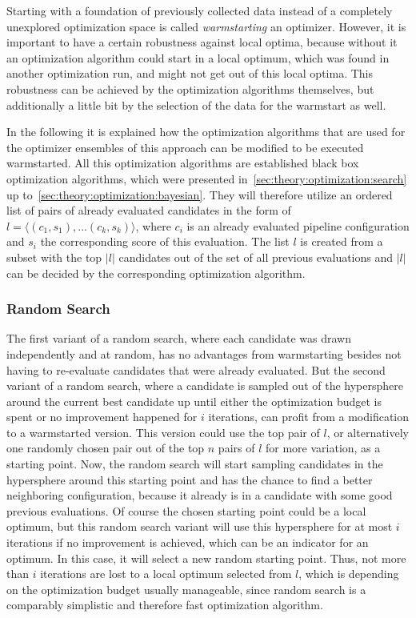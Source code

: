 Starting with a foundation of previously collected data instead of a completely unexplored optimization space is called \textit{warmstarting} an optimizer.
However, it is important to have a certain robustness against local optima, because without it an optimization algorithm could start in a local optimum, which was found in another optimization run, and might not get out of this local optima.
This robustness can be achieved by the optimization algorithms themselves, but additionally a little bit by the selection of the data for the warmstart as well.

In the following it is explained how the optimization algorithms that are used for the optimizer ensembles of this approach can be modified to be executed warmstarted.
All this optimization algorithms are established black box optimization algorithms, which were presented in~\ref{sec:theory:optimization:search} up to~\ref{sec:theory:optimization:bayesian}.
They will therefore utilize an ordered list of pairs of already evaluated candidates in the form of $l = \langle (c_1, s_1), ... (c_k, s_k) \rangle$, where $c_i$ is an already evaluated pipeline configuration and $s_i$ the corresponding score of this evaluation.
The list $l$ is created from a subset with the top $|l|$ candidates out of the set of all previous evaluations and $|l|$ can be decided by the corresponding optimization algorithm.

\subsubsection{Random Search}
The first variant of a random search, where each candidate was drawn independently and at random, has no advantages from warmstarting besides not having to re-evaluate candidates that were already evaluated.\newline
But the second variant of a random search, where a candidate is sampled out of the hypersphere around the current best candidate up until either the optimization budget is spent or no improvement happened for $i$ iterations, can profit from a modification to a warmstarted version.
This version could use the top pair of $l$, or alternatively one randomly chosen pair  out of the top $n$ pairs of $l$ for more variation, as a starting point.\newline
Now, the random search will start sampling candidates in the hypersphere around this starting point and has the chance to find a better neighboring configuration, because it already is in a candidate with some good previous evaluations.\newline
Of course the chosen starting point could be a local optimum, but this random search variant will use this hypersphere for at most $i$ iterations if no improvement is achieved, which can be an indicator for an optimum.
In this case, it will select a new random starting point.
Thus, not more than $i$ iterations are lost to a local optimum selected from $l$, which is depending on the optimization budget usually manageable, since random search is a comparably simplistic and therefore fast optimization algorithm.


